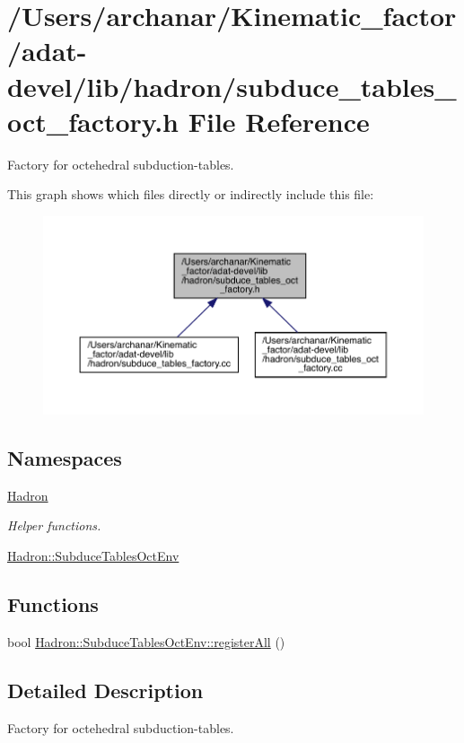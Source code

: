 \hypertarget{adat-devel_2lib_2hadron_2subduce__tables__oct__factory_8h}{}\section{/\+Users/archanar/\+Kinematic\+\_\+factor/adat-\/devel/lib/hadron/subduce\+\_\+tables\+\_\+oct\+\_\+factory.h File Reference}
\label{adat-devel_2lib_2hadron_2subduce__tables__oct__factory_8h}


Factory for octehedral subduction-\/tables.  


This graph shows which files directly or indirectly include this file\+:
\nopagebreak
\begin{figure}[H]
\begin{center}
\leavevmode
\includegraphics[width=350pt]{d7/d9a/adat-devel_2lib_2hadron_2subduce__tables__oct__factory_8h__dep__incl}
\end{center}
\end{figure}
\subsection*{Namespaces}
\begin{DoxyCompactItemize}
\item 
 \mbox{\hyperlink{namespaceHadron}{Hadron}}
\begin{DoxyCompactList}\small\item\em Helper functions. \end{DoxyCompactList}\item 
 \mbox{\hyperlink{namespaceHadron_1_1SubduceTablesOctEnv}{Hadron\+::\+Subduce\+Tables\+Oct\+Env}}
\end{DoxyCompactItemize}
\subsection*{Functions}
\begin{DoxyCompactItemize}
\item 
bool \mbox{\hyperlink{namespaceHadron_1_1SubduceTablesOctEnv_a51ef987c89c5e4509cb7c7c24fb152d6}{Hadron\+::\+Subduce\+Tables\+Oct\+Env\+::register\+All}} ()
\end{DoxyCompactItemize}


\subsection{Detailed Description}
Factory for octehedral subduction-\/tables. 

